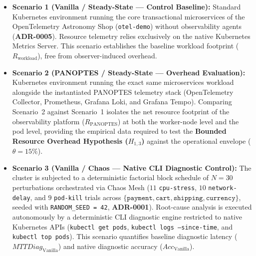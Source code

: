 \begin{itemize}
    \item \textbf{Scenario 1 (Vanilla / Steady-State --- Control Baseline):} Standard Kubernetes environment running the core transactional microservices of the OpenTelemetry Astronomy Shop (\texttt{otel-demo}) without observability agents (\textbf{ADR-0005}). Resource telemetry relies exclusively on the native Kubernetes Metrics Server. This scenario establishes the baseline workload footprint ($R_{\text{workload}}$), free from observer-induced overhead.
    
    \item \textbf{Scenario 2 (PANOPTES / Steady-State --- Overhead Evaluation):} Kubernetes environment running the exact same microservices workload alongside the instantiated PANOPTES telemetry stack (OpenTelemetry Collector, Prometheus, Grafana Loki, and Grafana Tempo). Comparing Scenario~2 against Scenario~1 isolates the net resource footprint of the observability platform ($R_{\text{PANOPTES}}$) at both the worker-node level and the pod level, providing the empirical data required to test the \textbf{Bounded Resource Overhead Hypothesis ($H_{1,3}$)} against the operational envelope ($\theta = 15\%$).
    
    \item \textbf{Scenario 3 (Vanilla / Chaos --- Native CLI Diagnostic Control):} The cluster is subjected to a deterministic factorial block schedule of $N=30$ perturbations orchestrated via Chaos Mesh ($11$ \texttt{cpu-stress}, $10$ \texttt{network-delay}, and $9$ \texttt{pod-kill} trials across $\{\texttt{payment}, \texttt{cart}, \texttt{shipping}, \texttt{currency}\}$, seeded with \texttt{RANDOM\_SEED = 42}, \textbf{ADR-0001}). Root-cause analysis is executed autonomously by a deterministic CLI diagnostic engine restricted to native Kubernetes APIs (\texttt{kubectl get pods}, \texttt{kubectl logs --since-time}, and \texttt{kubectl top pods}). This scenario quantifies baseline diagnostic latency ($MTTDiag_{\text{Vanilla}}$) and native diagnostic accuracy ($Acc_{\text{Vanilla}}$).
    

\end{itemize}
